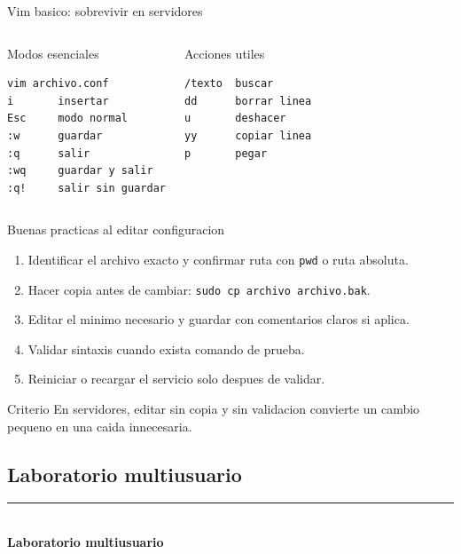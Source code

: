 \documentclass[aspectratio=169]{beamer}
\newcommand{\MainHeaderSlide}[2]{%
  \begin{frame}[plain]
    \hypertarget{#2}{}
    \vspace*{0.25\textheight}
    {\color{black}\rule{0.28\textwidth}{1.2pt}}\\[0.5em]
    {\usebeamerfont{title}\fontsize{34}{40}\selectfont\bfseries #1}
  \end{frame}
}
\begin{document}
\begin{frame}[fragile]{Vim basico: sobrevivir en servidores}
  \small
  \begin{columns}[t]
    \begin{block}{Modos esenciales}
\begin{verbatim}
vim archivo.conf
i       insertar
Esc     modo normal
:w      guardar
:q      salir
:wq     guardar y salir
:q!     salir sin guardar
\end{verbatim}
    \end{block}
    \begin{exampleblock}{Acciones utiles}
\begin{verbatim}
/texto  buscar
dd      borrar linea
u       deshacer
yy      copiar linea
p       pegar
\end{verbatim}
    \end{exampleblock}
  \end{columns}
\end{frame}

\begin{frame}{Buenas practicas al editar configuracion}
  \begin{enumerate}
    \item Identificar el archivo exacto y confirmar ruta con \texttt{pwd} o ruta absoluta.
    \item Hacer copia antes de cambiar: \texttt{sudo cp archivo archivo.bak}.
    \item Editar el minimo necesario y guardar con comentarios claros si aplica.
    \item Validar sintaxis cuando exista comando de prueba.
    \item Reiniciar o recargar el servicio solo despues de validar.
  \end{enumerate}
  \vfill
  \begin{alertblock}{Criterio}
    \small En servidores, editar sin copia y sin validacion convierte un cambio pequeno en una caida innecesaria.
  \end{alertblock}
\end{frame}

\subsection{Laboratorio multiusuario}
\MainHeaderSlide{Laboratorio multiusuario}{idx-lab-multiusuario}
\end{document}
